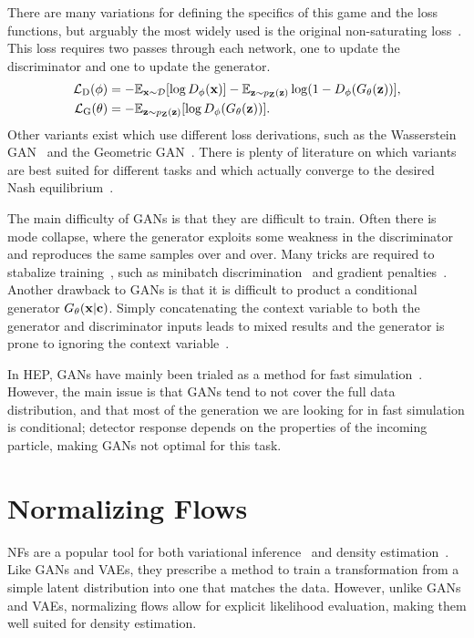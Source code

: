 There are many variations for defining the specifics of this game and the loss functions, but arguably the most widely used is the original non-saturating loss~\cite{GenerativeAdversarialNetworks}.
This loss requires two passes through each network, one to update the discriminator and one to update the generator.
\begin{align}
    \mathcal{L}_{\text{D}}(\phi) &= -\mathbb{E}_{\mathbf{x} \sim \mathcal{D}}[\log D_{\phi}(\mathbf{x})] - \mathbb{E}_{\mathbf{z} \sim p_{\mathbf{Z}}(\mathbf{z})}\log(1 - D_{\phi}(G_{\theta}(\mathbf{z}))], \\
    \mathcal{L}_{\text{G}}(\theta) &= -\mathbb{E}_{\mathbf{z} \sim p_{\mathbf{Z}}(\mathbf{z})}[\log D_{\phi}(G_{\theta}(\mathbf{z}))].
\end{align}
Other variants exist which use different loss derivations, such as the Wasserstein GAN~\cite{WGAN1} and the Geometric GAN~\cite{GeometricGAN}.
There is plenty of literature on which variants are best suited for different tasks and which actually converge to the desired Nash equilibrium~\cite{WhichTrainingMethods}.

The main difficulty of GANs is that they are difficult to train.
Often there is mode collapse, where the generator exploits some weakness in the discriminator and reproduces the same samples over and over.
Many tricks are required to stabalize training~\cite{WhichTrainingMethods}, such as minibatch discrimination~\cite{ProGAN} and gradient penalties~\cite{WGAN}.
Another drawback to GANs is that it is difficult to product a conditional generator $G_\theta(\mathbf{x}|\mathbf{c})$.
Simply concatenating the context variable to both the generator and discriminator inputs leads to mixed results and the generator is prone to ignoring the context variable~\cite{cGAN}.

In HEP, GANs have mainly been trialed as a method for fast simulation~\cite{MPGAN, GAPT, CaloGAN, EPICGAN}.
However, the main issue is that GANs tend to not cover the full data distribution, and that most of the generation we are looking for in fast simulation is conditional;
detector response depends on the properties of the incoming particle, making GANs not optimal for this task.

\section{Normalizing Flows}

NFs are a popular tool for both variational inference~\cite{VariationalInferenceNormalizing, NormalizingFlowsProbabilistic}
and density estimation~\cite{NICENonlinearIndependent}.
Like GANs and VAEs, they prescribe a method to train a transformation from a simple latent distribution into one that matches the data.
However, unlike GANs and VAEs, normalizing flows allow for explicit likelihood evaluation, making them well suited for density estimation.

